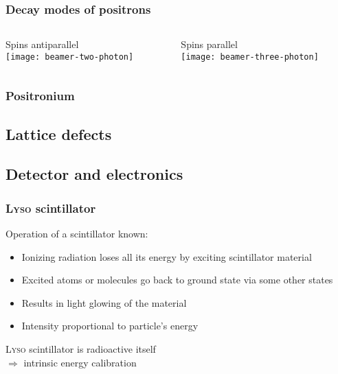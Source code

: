 \documentclass[english, fleqn]{beamer}
\begin{document}
\begin{frame}
    \frametitle{Decay modes of positrons}

    \begin{columns}[T]
        \begin{column}{.5\textwidth}
            Spins antiparallel\\
            \vspace{1cm}
            \centering
            \texttt{[image: beamer-two-photon]}
        \end{column}
        \begin{column}{.5\textwidth}
            Spins parallel\\
            \centering
            \texttt{[image: beamer-three-photon]}
        \end{column}
    \end{columns}
\end{frame}

\begin{frame}
    \frametitle{Positronium}
\end{frame}

\subsection{Lattice defects}

\begin{frame}
    \frametitle{}
\end{frame}

\subsection{Detector and electronics}

\begin{frame}
    \frametitle{\textsc{Lyso} scintillator}
    Operation of a scintillator known:
    \pause
    \begin{itemize}
        \item 
            Ionizing radiation loses all its energy by exciting scintillator material
        \item
            Excited atoms or molecules go back to ground state via some other states
        \item
            Results in light glowing of the material
        \item
            Intensity proportional to particle's energy
    \end{itemize}
    \textsc{Lyso} scintillator is radioactive itself\\
    $\Rightarrow$ intrinsic energy calibration
\end{frame}
\end{document}
